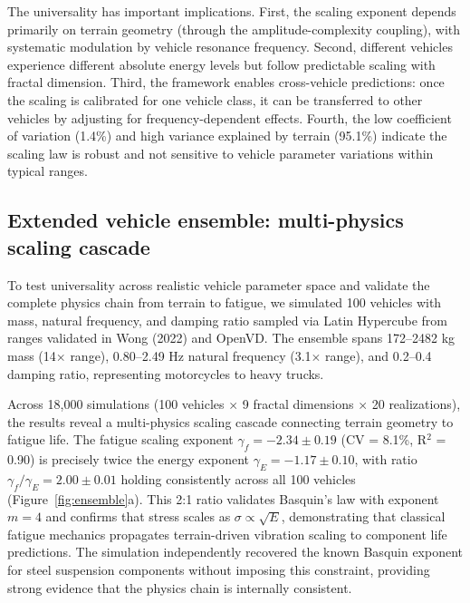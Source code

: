 \documentclass[11pt]{article}
\begin{document}
The universality has important implications. First, the scaling exponent depends primarily on terrain geometry (through the amplitude-complexity coupling), with systematic modulation by vehicle resonance frequency. Second, different vehicles experience different absolute energy levels but follow predictable scaling with fractal dimension. Third, the framework enables cross-vehicle predictions: once the scaling is calibrated for one vehicle class, it can be transferred to other vehicles by adjusting for frequency-dependent effects. Fourth, the low coefficient of variation (1.4\%) and high variance explained by terrain (95.1\%) indicate the scaling law is robust and not sensitive to vehicle parameter variations within typical ranges.


\subsection*{Extended vehicle ensemble: multi-physics scaling cascade}

To test universality across realistic vehicle parameter space and validate the complete physics chain from terrain to fatigue, we simulated 100 vehicles with mass, natural frequency, and damping ratio sampled via Latin Hypercube from ranges validated in Wong (2022)\cite{Wong2022} and OpenVD. The ensemble spans 172--2482 kg mass (14$\times$ range), 0.80--2.49 Hz natural frequency (3.1$\times$ range), and 0.2--0.4 damping ratio, representing motorcycles to heavy trucks.

Across 18,000 simulations (100 vehicles $\times$ 9 fractal dimensions $\times$ 20 realizations), the results reveal a multi-physics scaling cascade connecting terrain geometry to fatigue life. The fatigue scaling exponent $\gamma_f = -2.34 \pm 0.19$ (CV = 8.1\%, R$^2$ = 0.90) is precisely twice the energy exponent $\gamma_E = -1.17 \pm 0.10$, with ratio $\gamma_f / \gamma_E = 2.00 \pm 0.01$ holding consistently across all 100 vehicles (Figure~\ref{fig:ensemble}a). This 2:1 ratio validates Basquin's law with exponent $m = 4$ and confirms that stress scales as $\sigma \propto \sqrt{E}$, demonstrating that classical fatigue mechanics propagates terrain-driven vibration scaling to component life predictions. The simulation independently recovered the known Basquin exponent for steel suspension components without imposing this constraint, providing strong evidence that the physics chain is internally consistent.
\end{document}
